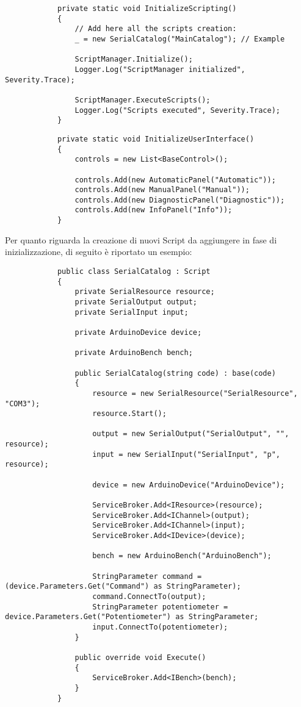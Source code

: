 \documentclass{article}
\begin{document}
		\begin{lstlisting}
			private static void InitializeScripting()
			{
				// Add here all the scripts creation:
				_ = new SerialCatalog("MainCatalog"); // Example
				
				ScriptManager.Initialize();
				Logger.Log("ScriptManager initialized", Severity.Trace);
				
				ScriptManager.ExecuteScripts();
				Logger.Log("Scripts executed", Severity.Trace);
			}
		\end{lstlisting}
	
		\begin{lstlisting}
			private static void InitializeUserInterface()
			{
				controls = new List<BaseControl>();
				
				controls.Add(new AutomaticPanel("Automatic"));
				controls.Add(new ManualPanel("Manual"));
				controls.Add(new DiagnosticPanel("Diagnostic"));
				controls.Add(new InfoPanel("Info"));
			}
		\end{lstlisting}
	
		Per quanto riguarda la creazione di nuovi Script da aggiungere in fase di inizializzazione, di seguito è riportato un esempio:
		
		\begin{lstlisting}
			public class SerialCatalog : Script
			{
				private SerialResource resource;
				private SerialOutput output;
				private SerialInput input;
				
				private ArduinoDevice device;
				
				private ArduinoBench bench;
				
				public SerialCatalog(string code) : base(code)
				{
					resource = new SerialResource("SerialResource", "COM3");
					resource.Start();
					
					output = new SerialOutput("SerialOutput", "", resource);
					input = new SerialInput("SerialInput", "p", resource);
					
					device = new ArduinoDevice("ArduinoDevice");
					
					ServiceBroker.Add<IResource>(resource);
					ServiceBroker.Add<IChannel>(output);
					ServiceBroker.Add<IChannel>(input);
					ServiceBroker.Add<IDevice>(device);
					
					bench = new ArduinoBench("ArduinoBench");
					
					StringParameter command = (device.Parameters.Get("Command") as StringParameter);
					command.ConnectTo(output);
					StringParameter potentiometer = device.Parameters.Get("Potentiometer") as StringParameter;
					input.ConnectTo(potentiometer);
				}
				
				public override void Execute()
				{
					ServiceBroker.Add<IBench>(bench);
				}
			}
		\end{lstlisting}
		
\end{document}
